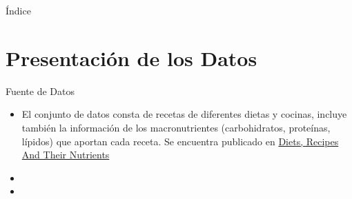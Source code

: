 \documentclass{beamer}
\begin{document}
    \begin{frame}[plain]{Índice}
        \tableofcontents
    \end{frame}

    \section{Presentación de los Datos}

    \begin{frame}{Fuente de Datos}
        \begin{itemize}
            \item<1->El conjunto de datos consta de recetas 
            de diferentes dietas y cocinas, incluye también 
            la información de los macronutrientes (carbohidratos, 
            proteínas, lípidos) que aportan cada receta. Se 
            encuentra publicado en \href{https://www.kaggle.com/datasets/thedevastator/healthy-diet-recipes-a-comprehensive-dataset}{Diets, Recipes And Their Nutrients}
            \item<2->
            \item<3->
        \end{itemize}
    \end{frame}
\end{document}
